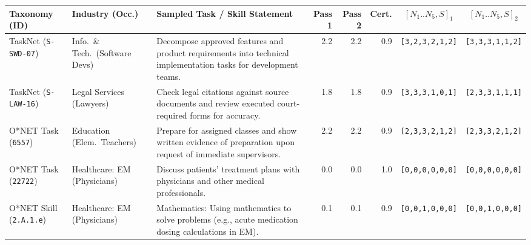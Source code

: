 \documentclass[9pt,letterpaper]{extarticle}
\begin{document}
\begin{table}[h!]
\vspace{2pt}
\begin{tabularx}{\textwidth}{@{}p{0.82in}p{0.92in}X r r r c c@{}}
\toprule
\textbf{Taxonomy (ID)} & \textbf{Industry (Occ.)} & \textbf{Sampled Task / Skill Statement} & \textbf{Pass 1} & \textbf{Pass 2} & \textbf{Cert.} & \textbf{$[N_1..N_5,S]_1$} & \textbf{$[N_1..N_5,S]_2$} \\
\midrule
TaskNet (\texttt{S-SWD-07}) & Info.\ \& Tech.\ (Software Devs) & Decompose approved features and product requirements into technical implementation tasks for development teams. & 2.2 & 2.2 & 0.9 & \texttt{[3,2,3,2,1,2]} & \texttt{[3,3,3,1,1,2]} \\
TaskNet (\texttt{S-LAW-16}) & Legal Services (Lawyers) & Check legal citations against source documents and review executed court-required forms for accuracy. & 1.8 & 1.8 & 0.9 & \texttt{[3,3,3,1,0,1]} & \texttt{[2,3,3,1,1,1]} \\
O*NET Task (\texttt{6557}) & Education (Elem.\ Teachers) & Prepare for assigned classes and show written evidence of preparation upon request of immediate supervisors. & 2.2 & 2.2 & 0.9 & \texttt{[2,3,3,2,1,2]} & \texttt{[2,3,3,2,1,2]} \\
O*NET Task (\texttt{22722}) & Healthcare: EM (Physicians) & Discuss patients' treatment plans with physicians and other medical professionals. & 0.0 & 0.0 & 1.0 & \texttt{[0,0,0,0,0,0]} & \texttt{[0,0,0,0,0,0]} \\
O*NET Skill (\texttt{2.A.1.e}) & Healthcare: EM (Physicians) & Mathematics: Using mathematics to solve problems (e.g., acute medication dosing calculations in EM). & 0.1 & 0.1 & 0.9 & \texttt{[0,0,1,0,0,0]} & \texttt{[0,0,1,0,0,0]} \\
\bottomrule
\end{tabularx}
\end{table}
\end{document}
